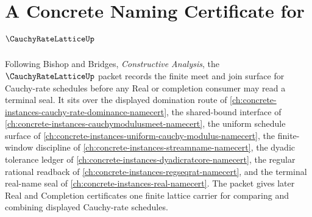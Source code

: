 \chapter{A Concrete Naming Certificate for $\CauchyRateLatticeUp$}
\label{ch:concrete-instances-cauchy-rate-lattice-namecert}

Following Bishop and Bridges, \emph{Constructive Analysis}, the $\CauchyRateLatticeUp$ packet records the finite meet and join surface for Cauchy-rate schedules before any Real or completion consumer may read a terminal seal. It sits over the displayed domination route of \autoref{ch:concrete-instances-cauchy-rate-dominance-namecert}, the shared-bound interface of \autoref{ch:concrete-instances-cauchymodulusmeet-namecert}, the uniform schedule surface of \autoref{ch:concrete-instances-uniform-cauchy-modulus-namecert}, the finite-window discipline of \autoref{ch:concrete-instances-streamname-namecert}, the dyadic tolerance ledger of \autoref{ch:concrete-instances-dyadicratcore-namecert}, the regular rational readback of \autoref{ch:concrete-instances-regseqrat-namecert}, and the terminal real-name seal of \autoref{ch:concrete-instances-real-namecert}. The packet gives later Real and Completion certificates one finite lattice carrier for comparing and combining displayed Cauchy-rate schedules.

